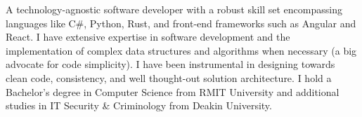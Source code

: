 \par{
A technology-agnostic software developer with a robust skill set encompassing languages like C\#, Python, Rust, and front-end frameworks such as Angular and React. I have extensive expertise in software development and the implementation of complex data structures and algorithms when necessary (a big advocate for code simplicity). I have been instrumental in designing towards clean code, consistency, and well thought-out solution architecture. I hold a Bachelor's degree in Computer Science from RMIT University and additional studies in IT Security \& Criminology from Deakin University.
}